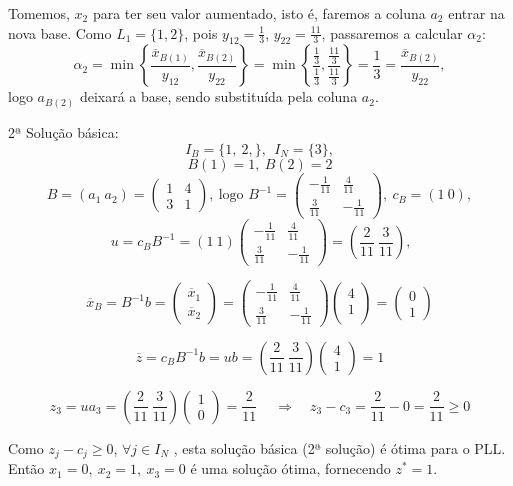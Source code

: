 \documentclass[12pt]{exam}
\begin{document}
\begin{questions}
\begin{solution}
Tomemos, $x_2$ para ter seu valor aumentado, isto é, faremos a coluna $a_2$ entrar na nova base. Como $L_1 = \{1, 2\}$, pois $y_{12} = \frac{1}{3}$, $y_{22} = \frac{11}{3}$, passaremos a calcular $\alpha_2$:
$$\alpha_2 = \min\left\lbrace\frac{\overline{x}_{B(1)}}{y_{12}},\frac{\overline{x}_{B(2)}}{y_{22}}\right\rbrace  = \min\left\lbrace\frac{\frac{1}{3}}{\frac{1}{3}}, \frac{\frac{11}{3}}{\frac{11}{3}} \right\rbrace = \frac{1}{3} = \frac{\overline{x}_{B(2)}}{y_{22}},$$
logo $a_{B(2)}$ deixará a base, sendo substituída pela coluna $a_2$.

2ª Solução básica:
	$$I_B = \{1,~2,\},~~I_N = \{3\},$$
	$$B(1) = 1,~ B(2) = 2$$
	$$B = (a_1~a_2) =\begin{pmatrix}
	1 & 4 \\
	3 & 1
	\end{pmatrix},~\text{logo } B^{-1} = \begin{pmatrix}
	-\frac{1}{11} & \frac{4}{11} \\
	\frac{3}{11} & -\frac{1}{11}
	\end{pmatrix},~c_B = (1~0),$$
	$$~u = c_BB^{-1} = (1~1)\begin{pmatrix}
	-\frac{1}{11} & \frac{4}{11} \\
	\frac{3}{11} & -\frac{1}{11}	
	\end{pmatrix} = (\frac{2}{11}~\frac{3}{11}),$$
	
	$$ \overline{x}_B =B^{-1}b = \begin{pmatrix}
	\overline{x}_1 \\ 
	\overline{x}_2 
	\end{pmatrix} = \begin{pmatrix}
	-\frac{1}{11} & \frac{4}{11} \\
	\frac{3}{11} & -\frac{1}{11}
	\end{pmatrix} \begin{pmatrix}
	4 \\ 
	1 \\ 
	\end{pmatrix} = \begin{pmatrix}
	0 \\ 
	1
	\end{pmatrix}$$

	$$\overline{z} = c_BB^{-1}b = ub = (\frac{2}{11}~\frac{3}{11}) \begin{pmatrix}
	4 \\ 
	1 
	\end{pmatrix} = 1$$
	
	$$z_3 = ua_3 = (\frac{2}{11}~\frac{3}{11})\begin{pmatrix}
	1 \\ 
	0 
	\end{pmatrix} = \frac{2}{11}~\quad \Rightarrow \quad z_3 - c_3 = \frac{2}{11} - 0 = \frac{2}{11} \geq 0$$
	
	Como $z_j - c_j \geq 0$, $\forall j \in I_N$ , esta solução básica (2ª solução) é ótima para o PLL. \\ 
Então $x_1 = 0 ,~x_2 = 1,~x_3 = 0$ é uma solução ótima, fornecendo $z^{*} = 1$. 	\end{solution}	

\end{questions}
	
\end{document}
